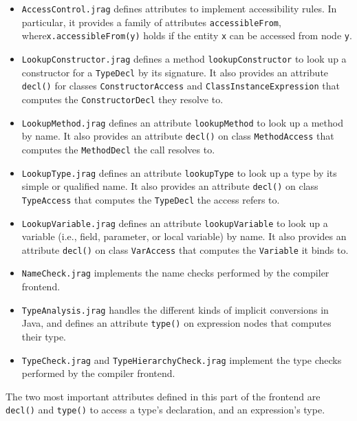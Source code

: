 \documentclass{article}
\newcommand{\file}[1]{\texttt{#1}}
\newcommand{\nt}[1]{\texttt{#1}}
\newcommand{\code}[1]{\lstinline$#1$}
\begin{document}
\begin{itemize}
\item \file{AccessControl.jrag} defines attributes to implement accessibility
  rules. In particular, it provides a family of attributes
  \code{accessibleFrom}, where\linebreak \code{x.accessibleFrom(y)} holds if
  the entity \code{x} can be accessed from node \code{y}.

\item \file{LookupConstructor.jrag} defines a method \code{lookupConstructor}
  to look up a constructor for a \nt{TypeDecl} by its signature. It also
  provides an attribute \code{decl()} for classes \nt{ConstructorAccess} and
  \nt{ClassInstanceExpression} that computes the \nt{ConstructorDecl} they
  resolve to.

\item \file{LookupMethod.jrag} defines an attribute \code{lookupMethod} to
  look up a method by name. It also provides an attribute \code{decl()} on
  class \nt{MethodAccess} that computes the \nt{MethodDecl} the call resolves
  to.

\item \file{LookupType.jrag} defines an attribute \code{lookupType} to look up
  a type by its simple or qualified name. It also provides an attribute
  \code{decl()} on class \nt{TypeAccess} that computes the \nt{TypeDecl}
  the access refers to.

\item \file{LookupVariable.jrag} defines an attribute \code{lookupVariable}
  to look up a variable (i.e., field, parameter, or local variable) by name.
  It also provides an attribute \code{decl()} on class \nt{VarAccess} that
  computes the \nt{Variable} it binds to.

\item \file{NameCheck.jrag} implements the name checks performed by the
  compiler frontend.

\item \file{TypeAnalysis.jrag} handles the different kinds of implicit 
  conversions in Java, and defines an attribute \code{type()} on expression
  nodes that computes their type.
  
\item \file{TypeCheck.jrag} and \file{TypeHierarchyCheck.jrag} implement 
  the type checks performed by the compiler frontend.
\end{itemize}

The two most important attributes defined in this part of the frontend are
\code{decl()} and \code{type()} to access a type's declaration, and an
expression's type.
\end{document}
